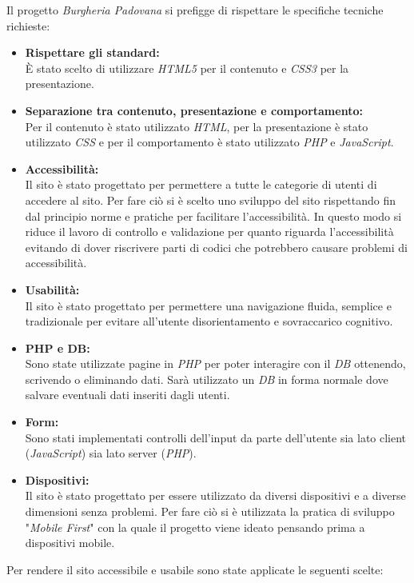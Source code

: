 Il progetto \emph{Burgheria Padovana} si prefigge di rispettare le specifiche tecniche richieste:
\begin{itemize}
	\item \textbf{Rispettare gli standard:}\\ 
	È stato scelto di utilizzare \emph{HTML5} per il contenuto e \emph{CSS3} per la presentazione.
	\item \textbf{Separazione tra contenuto, presentazione e comportamento:}\\ 
	Per il contenuto è stato utilizzato \emph{HTML}, per la presentazione è stato utilizzato \emph{CSS} e per il comportamento è stato utilizzato \emph{PHP} e \emph{JavaScript}.
	\item \textbf{Accessibilità:}\\ 
	Il sito è stato progettato per permettere a tutte le categorie di utenti di accedere al sito.
	Per fare ciò si è scelto uno sviluppo del sito rispettando fin dal principio norme e pratiche per facilitare l'accessibilità.
	In questo modo si riduce il lavoro di controllo e validazione per quanto riguarda l'accessibilità evitando di dover riscrivere parti di codici che potrebbero causare problemi di accessibilità.
	\item \textbf{Usabilità:}\\
	Il sito è stato progettato per permettere una navigazione fluida, semplice e tradizionale per evitare all'utente disorientamento e sovraccarico cognitivo.
	\item \textbf{PHP e DB:}\\
	Sono state utilizzate pagine in \emph{PHP} per poter interagire con il \emph{DB} ottenendo, scrivendo o eliminando dati. Sarà utilizzato un \emph{DB} in forma normale dove salvare eventuali dati inseriti dagli utenti.
	\item \textbf{Form:}\\
	Sono stati implementati controlli dell'input da parte dell'utente sia lato client (\emph{JavaScript}) sia lato server (\emph{PHP}).
	\item \textbf{Dispositivi:}\\
	Il sito è stato progettato per essere utilizzato da diversi dispositivi e a diverse dimensioni senza problemi. Per fare ciò si è utilizzata la pratica di sviluppo "\emph{Mobile First}" con la quale il progetto viene ideato pensando prima a dispositivi mobile.
\end{itemize}
Per rendere il sito accessibile e usabile sono state applicate le seguenti scelte: 
